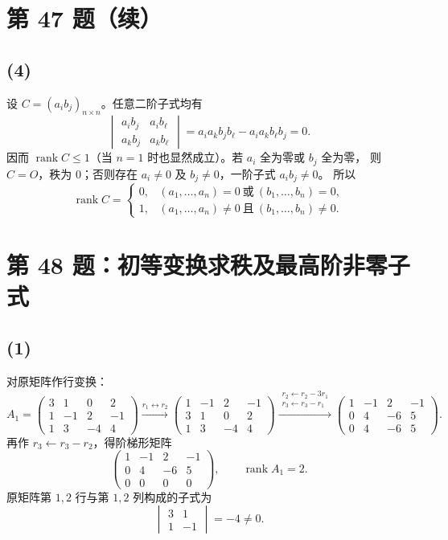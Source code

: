 \documentclass[11pt,a4paper,fontset=fandol]{ctexart}
\newcommand{\rk}{\operatorname{rank}}
\newcommand{\ans}[1]{\boxed{#1}}
\newcommand{\problem}[1]{\Needspace{8\baselineskip}\section*{#1}}
\newcommand{\parttitle}[1]{\Needspace{7\baselineskip}\subsection*{#1}}
\begin{document}
\newpage
\section*{第 47 题（续）}
\parttitle{(4)}
设 $C=(a_i b_j)_{n\times n}$。任意二阶子式均有
\[
\begin{vmatrix}a_i b_j&a_i b_\ell\\a_k b_j&a_k b_\ell\end{vmatrix}
=a_i a_k b_j b_\ell-a_i a_k b_\ell b_j=0.
\]
因而 $\rk C\le1$（当 $n=1$ 时也显然成立）。若 $a_i$ 全为零或 $b_j$ 全为零，
则 $C=O$，秩为 $0$；否则存在 $a_i\ne0$ 及 $b_j\ne0$，一阶子式 $a_i b_j\ne0$。
所以
\[
\ans{\rk C=
\begin{cases}
0,&(a_1,\ldots,a_n)=0\ \text{或}\ (b_1,\ldots,b_n)=0,\\
1,&(a_1,\ldots,a_n)\ne0\ \text{且}\ (b_1,\ldots,b_n)\ne0.
\end{cases}}
\]

\problem{第 48 题：初等变换求秩及最高阶非零子式}
\parttitle{(1)}
对原矩阵作行变换：
\[
A_1=\begin{pmatrix}3&1&0&2\\1&-1&2&-1\\1&3&-4&4\end{pmatrix}
\xrightarrow{r_1\leftrightarrow r_2}
\begin{pmatrix}1&-1&2&-1\\3&1&0&2\\1&3&-4&4\end{pmatrix}
\xrightarrow{\substack{r_2\leftarrow r_2-3r_1\\r_3\leftarrow r_3-r_1}}
\begin{pmatrix}1&-1&2&-1\\0&4&-6&5\\0&4&-6&5\end{pmatrix}.
\]
再作 $r_3\leftarrow r_3-r_2$，得阶梯形矩阵
\[
\begin{pmatrix}1&-1&2&-1\\0&4&-6&5\\0&0&0&0\end{pmatrix},
\qquad \ans{\rk A_1=2}.
\]
原矩阵第 $1,2$ 行与第 $1,2$ 列构成的子式为
\[
\ans{\begin{vmatrix}3&1\\1&-1\end{vmatrix}=-4\ne0}.
\]
\end{document}
